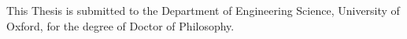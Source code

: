 This Thesis is submitted to the Department of Engineering Science, University of Oxford, for the 
degree of Doctor of Philosophy.
